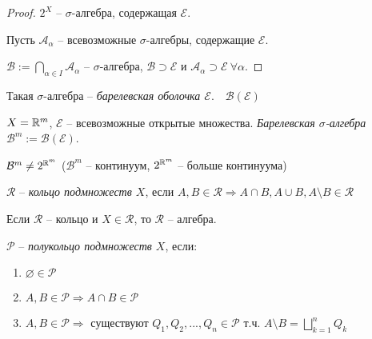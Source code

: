 \begin{proof}
    $2^X$ – $\sigma$-алгебра, содержащая $\mathcal{E}$.

    Пусть $\mathcal{A}_\alpha$ – всевозможные $\sigma$-алгебры, содержащие $\mathcal{E}$.

    $\mathcal{B} :=\bigcap\limits_{\alpha \in I}\mathcal{A}_\alpha$ – $\sigma$-алгебра, $\mathcal{B} \supset \mathcal{E}$ и $\mathcal{A}_\alpha \supset \mathcal{E}\ \forall \alpha$.
\end{proof}

\begin{definition}
    Такая $\sigma$-алгебра – \textit{барелевская оболочка $\mathcal{E}$}.$\quad \mathcal{B}(\mathcal{E})$
\end{definition}

\begin{definition}
    $X=\mathbb{R}^m$, $\mathcal{E}$ – всевозможные открытые множества. \textit{Барелевская $\sigma$-алгебра} $\mathcal{B}^m:=\mathcal{B}(\mathcal{E})$.
\end{definition}

\begin{remark}
    $\mathcal{B}^m\not = 2^{\mathbb{R}^m}$ ($\mathcal{B}^m$ – континуум, $2^{\mathbb{R}^m}$ – больше континуума)
\end{remark}

\begin{definition}
    $\mathcal{R}$ – \textit{кольцо подмножеств $X$}, если $A, B\in \mathcal{R}\Rightarrow A \cap B,  A \cup B,  A \setminus B\in \mathcal{R}$
\end{definition}

\begin{remark}
    Если $\mathcal{R}$ – кольцо и $X\in \mathcal{R}$, то $\mathcal{R}$ – алгебра.
\end{remark}

\begin{definition}
    $\mathcal{P}$ – \textit{полукольцо подмножеств $X$}, если:
    \begin{enumerate}
        \item $\varnothing \in \mathcal{P}$
        \item $A, B \in \mathcal{P}\Rightarrow A \cap B \in \mathcal{P}$
        \item $A, B \in \mathcal{P}\Rightarrow$ существуют $Q_1, Q_2, ..., Q_n\in \mathcal{P}$ 
            т.ч. $A\setminus B =\bigsqcup\limits_{k=1}^n Q_k$
    \end{enumerate}
\end{definition}

